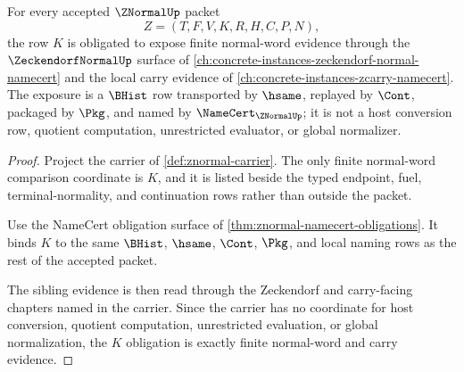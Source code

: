 \begin{theorem}
\label{thm:znormal-carry-normalization-obligation}
For every accepted $\ZNormalUp$ packet
$$
Z=(T,F,V,K,R,H,C,P,N),
$$
the row $K$ is obligated to expose finite normal-word evidence through the $\ZeckendorfNormalUp$ surface of \autoref{ch:concrete-instances-zeckendorf-normal-namecert} and the local carry evidence of \autoref{ch:concrete-instances-zcarry-namecert}. The exposure is a $\BHist$ row transported by $\hsame$, replayed by $\Cont$, packaged by $\Pkg$, and named by $\NameCert_{\ZNormalUp}$; it is not a host conversion row, quotient computation, unrestricted evaluator, or global normalizer.
\end{theorem}
\begin{proof}
Project the carrier of \autoref{def:znormal-carrier}. The only finite normal-word comparison coordinate is $K$, and it is listed beside the typed endpoint, fuel, terminal-normality, and continuation rows rather than outside the packet.

Use the NameCert obligation surface of \autoref{thm:znormal-namecert-obligations}. It binds $K$ to the same $\BHist$, $\hsame$, $\Cont$, $\Pkg$, and local naming rows as the rest of the accepted packet.

The sibling evidence is then read through the Zeckendorf and carry-facing chapters named in the carrier. Since the carrier has no coordinate for host conversion, quotient computation, unrestricted evaluation, or global normalization, the $K$ obligation is exactly finite normal-word and carry evidence.
\end{proof}

